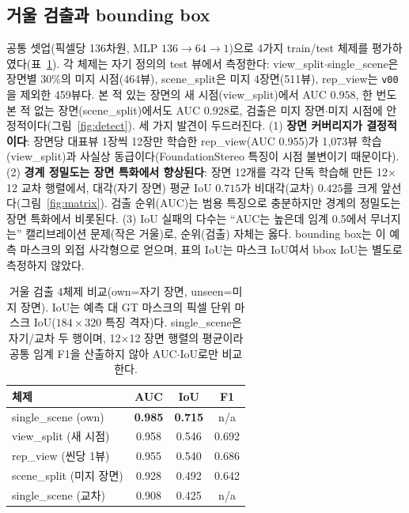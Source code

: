 \documentclass[10pt,a4paper]{article}
\begin{document}
\subsection{거울 검출과 bounding box}
공통 셋업(픽셀당 136차원, MLP $136\to64\to1$)으로 4가지 train/test 체제를 평가하였다(표~\ref{tab:detect}). 각 체제는 자기 정의의 test 뷰에서 측정한다: view\_split$\cdot$single\_scene은 장면별 $30\%$의 미지 시점(464뷰), scene\_split은 미지 4장면(511뷰), rep\_view는 \texttt{v00}을 제외한 459뷰다. 본 적 있는 장면의 새 시점(view\_split)에서 AUC $0.958$, 한 번도 본 적 없는 장면(scene\_split)에서도 AUC $0.928$로, 검출은 미지 장면$\cdot$미지 시점에 안정적이다(그림~\ref{fig:detect}). 세 가지 발견이 두드러진다. (1) \textbf{장면 커버리지가 결정적이다}: 장면당 대표뷰 1장씩 12장만 학습한 rep\_view(AUC 0.955)가 1{,}073뷰 학습(view\_split)과 사실상 동급이다(FoundationStereo 특징이 시점 불변이기 때문이다). (2) \textbf{경계 정밀도는 장면 특화에서 향상된다}: 장면 12개를 각각 단독 학습해 만든 12$\times$12 교차 행렬에서, 대각(자기 장면) 평균 IoU $0.715$가 비대각(교차) $0.425$를 크게 앞선다(그림~\ref{fig:matrix}). 검출 순위(AUC)는 범용 특징으로 충분하지만 경계의 정밀도는 장면 특화에서 비롯된다. (3) IoU 실패의 다수는 ``AUC는 높은데 임계 0.5에서 무너지는'' 캘리브레이션 문제(작은 거울)로, 순위(검출) 자체는 옳다. bounding box는 이 예측 마스크의 외접 사각형으로 얻으며, 표의 IoU는 마스크 IoU여서 bbox IoU는 별도로 측정하지 않았다.

\begin{table}[h]
\centering
\caption{거울 검출 4체제 비교(own=자기 장면, unseen=미지 장면). IoU는 예측 대 GT 마스크의 픽셀 단위 마스크 IoU($184\times320$ 특징 격자)다. single\_scene은 자기/교차 두 행이며, 12$\times$12 장면 행렬의 평균이라 공통 임계 F1을 산출하지 않아 AUC$\cdot$IoU로만 비교한다.}
\label{tab:detect}
\begin{tabular}{lccc}
\toprule
체제 & AUC & IoU & F1 \\
\midrule
single\_scene (own)        & \textbf{0.985} & \textbf{0.715} & n/a \\
view\_split (새 시점)       & 0.958 & 0.546 & 0.692 \\
rep\_view (씬당 1뷰)        & 0.955 & 0.540 & 0.686 \\
scene\_split (미지 장면)    & 0.928 & 0.492 & 0.642 \\
single\_scene (교차)        & 0.908 & 0.425 & n/a \\
\bottomrule
\end{tabular}
\end{table}
\end{document}
